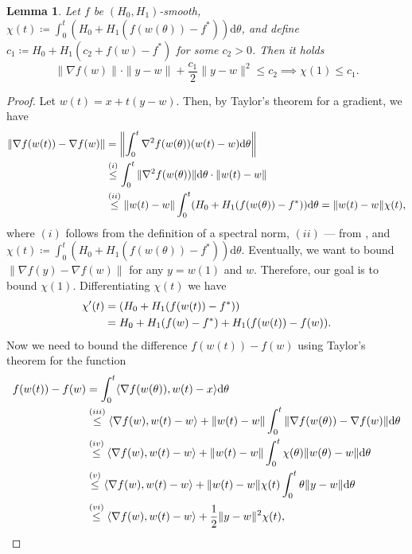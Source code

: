 \documentclass[a4paper,11pt]{article}
\newcommand{\diff}{\mathrm{d}}
\newcommand{\1}{\mathbbm{1}}
\newcommand{\eqdef}{\coloneqq}
\theoremstyle{plain}
\newtheorem{lemma}{Lemma}
\begin{document}
\begin{lemma}\label{lem:c1c2_bound} Let $f$ be $(H_0,H_1)$-smooth, $\chi(t) \eqdef \int_0^t (H_0 + H_1(f(w(\theta))-f^*))\diff \theta$, and define $c_1 \coloneqq H_0 + H_1(c_2 + f(w) - f^*)$ for some $c_2 > 0$. Then it holds 
    \[
    \|\nabla f(w)\|\cdot \|y-w\| + \frac{c_1}{2}\|y-w\|^2 \le c_2 \implies \chi(1) \leq c_1.
    \]

    
\end{lemma}
\begin{proof}
    Let $w(t) = x + t(y-w)$. Then, by Taylor's theorem for a gradient, we have
    \begin{align}
        \|\nabla f(w(t)) - \nabla f(w)\| &= \left\|\int_0^t \nabla^2f(w(\theta))(w(t)-w) \diff \theta\right\|\notag\\
        &\overset{(i)}{\le} \int_0^t \|\nabla^2f(w(\theta))\|\diff\theta\cdot \|w(t)-w\|\notag\\
        &\overset{(ii)}{\le} \|w(t)-w\|\int_0^t (H_0 + H_1(f(w(\theta)) - f^*))\diff \theta = \|w(t)-w\|\chi(t),\label{eq:noqjn1oub}
    \end{align}
    where $(i)$ follows from the definition of a spectral norm, $(ii)$ --- from , and $\chi(t) \eqdef \int_0^t (H_0 + H_1(f(w(\theta))-f^*))\diff \theta$.  Eventually, we want to bound $\|\nabla f(y) - \nabla f(w)\|$ for any $y=w(1)$ and $w$. Therefore, our goal is to bound $\chi(1)$. Differentiating $\chi(t)$ we have 
    \begin{align}\label{eq:pqkwnqlk}
        \chi^\prime(t) &= (H_0 + H_1(f(w(t)) - f^*))\notag\\
        &= H_0 + H_1(f(w) - f^*) + H_1(f(w(t)) - f(w)).
    \end{align}
    Now we need to bound the difference $f(w(t)) - f(w)$ using Taylor's theorem for the function 
    \begin{align}
        f(w(t)) - f(w) &= \int_0^t \langle\nabla f(w(\theta)), w(t)- x\rangle \diff \theta\\
        &\overset{(iii)}{\le} \langle \nabla f(w), w(t)-w\rangle + \|w(t)-w\|\int_0^t \|\nabla f(w(\theta)) - \nabla f(w)\|\diff \theta\notag\\
        &\overset{(iv)}{\le}\langle \nabla f(w), w(t)-w\rangle + \|w(t)-w\|\int_0^t\chi(\theta)\|w(\theta)-w\| \diff \theta\notag\\
        &\overset{(v)}{\le}\langle \nabla f(w), w(t)-w\rangle + \|w(t)-w\|\chi(t)\int_0^t\theta\|y-w\| \diff \theta\notag\\
        &\overset{(vi)}{\le} \langle \nabla f(w), w(t)-w\rangle + \frac{1}{2}\|y-w\|^2\chi(t),\label{eq:o3nwjdn}

\end{align}
\end{proof}
\end{document}
